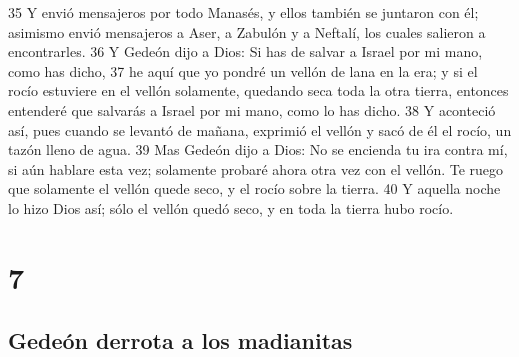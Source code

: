 35 Y envió mensajeros por todo Manasés, y ellos también se juntaron con él; asimismo envió mensajeros a Aser, a Zabulón y a Neftalí, los cuales salieron a encontrarles.
36 Y Gedeón dijo a Dios: Si has de salvar a Israel por mi mano, como has dicho,
37 he aquí que yo pondré un vellón de lana en la era; y si el rocío estuviere en el vellón solamente, quedando seca toda la otra tierra, entonces entenderé que salvarás a Israel por mi mano, como lo has dicho.
38 Y aconteció así, pues cuando se levantó de mañana, exprimió el vellón y sacó de él el rocío, un tazón lleno de agua.
39 Mas Gedeón dijo a Dios: No se encienda tu ira contra mí, si aún hablare esta vez; solamente probaré ahora otra vez con el vellón. Te ruego que solamente el vellón quede seco, y el rocío sobre la tierra.
40 Y aquella noche lo hizo Dios así; sólo el vellón quedó seco, y en toda la tierra hubo rocío.

\chapter{7}

\section*{Gedeón derrota a los madianitas}



